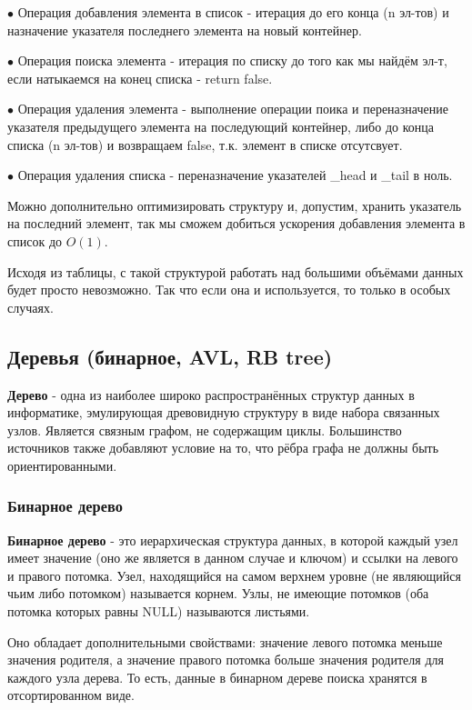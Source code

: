 \documentclass[utf8,14pt,a4paper,oneside,russian]{book}
\begin{document}
	$\bullet$ Операция добавления элемента в список - итерация до его конца (n эл-тов) и назначение указателя последнего элемента на новый контейнер.
	
	$\bullet$ Операция поиска элемента - итерация по списку до того как мы найдём эл-т, если натыкаемся на конец списка - return false.
	
	$\bullet$ Операция удаления элемента - выполнение операции поика и переназначение указателя предыдущего элемента на последующий контейнер, либо до конца списка (n эл-тов) и возвращаем false, т.к. элемент в списке отсутсвует.
	
	$\bullet$ Операция удаления списка - переназначение указателей \_head и \_tail в ноль.

	Можно дополнительно оптимизировать структуру и, допустим, хранить указатель на последний элемент, так мы сможем добиться ускорения добавления элемента в список до $O(1)$.
	
	Исходя из таблицы, с такой структурой работать над большими объёмами данных будет просто невозможно. Так что если она и используется, то только в особых случаях.
	
	\subsection{Деревья (бинарное, AVL, RB tree)}
	
	\textbf{Дерево} - одна из наиболее широко распространённых структур данных в информатике, эмулирующая древовидную структуру в виде набора связанных узлов. Является связным графом, не содержащим циклы. Большинство источников также добавляют условие на то, что рёбра графа не должны быть ориентированными.
	
	\subsubsection{Бинарное дерево}
	
	\textbf{Бинарное дерево} - это иерархическая структура данных, в которой каждый узел имеет значение (оно же является в данном случае и ключом) и ссылки на левого и правого потомка. Узел, находящийся на самом верхнем уровне (не являющийся чьим либо потомком) называется корнем. Узлы, не имеющие потомков (оба потомка которых равны NULL) называются листьями.
	
	Оно обладает дополнительными свойствами: значение левого потомка меньше значения родителя, а значение правого потомка больше значения родителя для каждого узла дерева. То есть, данные в бинарном дереве поиска хранятся в отсортированном виде.
	
\end{document}
